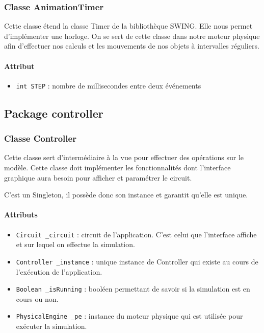 \documentclass{report}
\begin{document}
\subsubsection{Classe AnimationTimer}

Cette classe étend la classe Timer de la bibliothèque SWING. Elle nous permet d'implémenter une horloge. On se sert de cette classe dans notre moteur physique afin d'effectuer nos calculs et les mouvements de nos objets à intervalles réguliers.

\paragraph*{Attribut}
\begin{itemize}
\item \texttt{int STEP} : nombre de millisecondes entre deux événements
\end{itemize}

\subsection{Package controller}

\subsubsection{Classe Controller}

Cette classe sert d'intermédiaire à la vue pour effectuer des opérations sur le modèle. Cette classe doit implémenter les fonctionnalités dont l'interface graphique aura besoin pour afficher et paramétrer le circuit.

C'est un Singleton, il possède donc son instance et garantit qu'elle est unique.

\paragraph*{Attributs}
\begin{itemize}
\item \texttt{Circuit \_circuit} : circuit de l'application. C'est celui que l'interface affiche et sur lequel on effectue la simulation.
\item \texttt{Controller \_instance} : unique instance de Controller qui existe au cours de l'exécution de l'application.
\item \texttt{Boolean \_isRunning} : booléen permettant de savoir si la simulation est en cours ou non.
\item \texttt{PhysicalEngine \_pe} : instance du moteur physique qui est utilisée pour exécuter la simulation.
\end{itemize}
\end{document}
